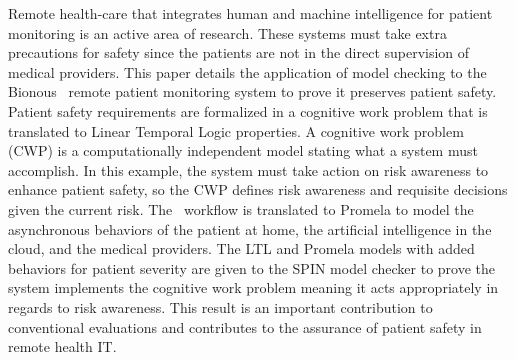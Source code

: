 Remote health-care that integrates human and machine intelligence for patient monitoring is an active area of research. These systems must take extra precautions for safety since the patients are not in the direct supervision of medical providers. This paper details the application of model checking to the Bionous \phware\ remote patient monitoring system to prove it preserves patient safety. Patient safety requirements are formalized in a cognitive work problem that is translated to Linear Temporal Logic properties. A cognitive work problem (CWP) is a computationally independent model stating what a system must accomplish. In this example, the system must take action on risk awareness to enhance patient safety, so the CWP defines risk awareness and requisite decisions given the current risk. The \phware\ workflow is translated to Promela to model the asynchronous behaviors of the patient at home, the artificial intelligence in the cloud, and the medical providers. The LTL and Promela models with added behaviors for patient severity are given to the SPIN model checker to prove the system implements the cognitive work problem meaning it acts appropriately in regards to risk awareness. This result is an important contribution to conventional evaluations and contributes to the assurance of patient safety in remote health IT.